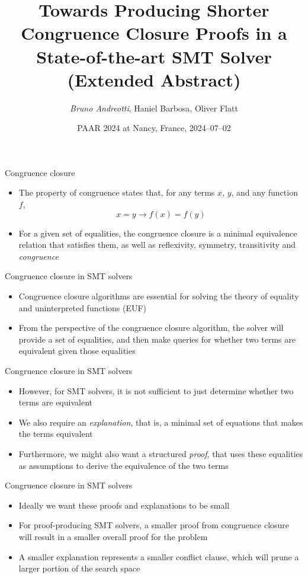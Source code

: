 \documentclass[aspectratio=169]{beamer}
\title[]{Towards Producing Shorter Congruence Closure Proofs in a State-of-the-art SMT Solver (Extended Abstract)}
\author{\emph{Bruno Andreotti}, Haniel Barbosa, Oliver Flatt}
\institute{}
\date{PAAR 2024 at Nancy, France, 2024--07--02}
\newcommand\vitem{\vfill\item}
\newcommand\pvitem{\pause\vfill\item}
\begin{document}
\begin{frame}
  \titlepage
\end{frame}

\begin{frame}{Congruence closure}
  \begin{itemize}
    \item The property of congruence states that, for any terms $x$, $y$, and
    any function $f$,
    $$x = y \rightarrow f(x) = f(y)$$
    \vitem For a given set of equalities, the congruence closure is a minimal
    equivalence relation that satisfies them, as well as reflexivity, symmetry,
    transitivity and \emph{congruence}
  \end{itemize}
\end{frame}

\begin{frame}{Congruence closure in SMT solvers}
  \begin{itemize}
    \item Congruence closure algorithms are essential for solving the theory of
    equality and uninterpreted functions (EUF)
    \vitem From the perspective of the congruence closure algorithm, the solver
    will provide a set of equalities, and then make queries for whether two
    terms are equivalent given those equalities
  \end{itemize}
\end{frame}

\begin{frame}{Congruence closure in SMT solvers}
  \begin{itemize}
    \item However, for SMT solvers, it is not sufficient to just determine
    whether two terms are equivalent
    \vitem We also require an \textit{explanation}, that is, a minimal set of
    equations that makes the terms equivalent
    \pvitem Furthermore, we might also want a structured \textit{proof}, that
    uses these equalities as assumptions to derive the equivalence of the two
    terms
  \end{itemize}
\end{frame}

\begin{frame}{Congruence closure in SMT solvers}
  \begin{itemize}
    \item Ideally we want these proofs and explanations to be small
    \vitem For proof-producing SMT solvers, a smaller proof from congruence
    closure will result in a smaller overall proof for the problem
    \pvitem A smaller explanation represents a smaller conflict clause, which
    will prune a larger portion of the search space
  \end{itemize}
\end{frame}
\end{document}
